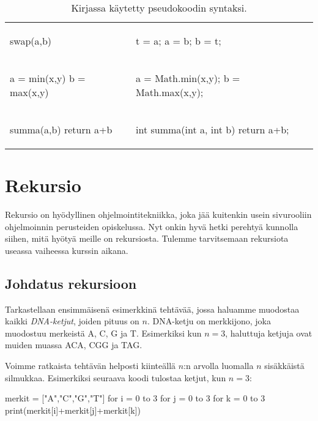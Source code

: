 \begin{table}
\begin{tabular}{ll}
\begin{smallcode}[xleftmargin=0pt]
swap(a,b)
\end{smallcode}
&
\begin{smallcode}
t = a;
a = b;
b = t;
\end{smallcode}
\\
\begin{smallcode}[xleftmargin=0pt]
a = min(x,y)
b = max(x,y)
\end{smallcode}
&
\begin{smallcode}
a = Math.min(x,y);
b = Math.max(x,y);
\end{smallcode}
\\
\begin{smallcode}[xleftmargin=0pt]
summa(a,b)
    return a+b
\end{smallcode}
&
\begin{smallcode}
int summa(int a, int b) {
    return a+b;
}
\end{smallcode}
\\
\end{tabular}
\caption{Kirjassa käytetty pseudokoodin syntaksi.}
\label{tab:psekoo}
\end{table}

\section{Rekursio}

Rekursio on hyödyllinen ohjelmointitekniikka,
joka jää kuitenkin usein sivurooliin ohjelmoinnin perusteiden opiskelussa.
Nyt onkin hyvä hetki perehtyä kunnolla siihen,
mitä hyötyä meille on rekursiosta.
Tulemme tarvitsemaan rekursiota useassa vaiheessa kurssin aikana.

\subsection{Johdatus rekursioon}

Tarkastellaan ensimmäisenä esimerkkinä tehtävää,
jossa haluamme muodostaa kaikki \emph{DNA-ketjut},
joiden pituus on $n$.
DNA-ketju on merkkijono, joka muodostuu merkeistä A, C, G ja T.
Esimerkiksi kun $n=3$, haluttuja ketjuja ovat muiden muassa
ACA, CGG ja TAG.

Voimme ratkaista tehtävän helposti kiinteällä $n$:n arvolla
luomalla $n$ sisäk\-käistä silmukkaa.
Esimerkiksi seuraava koodi tulostaa ketjut, kun $n=3$:

\begin{code}
merkit = ["A","C","G","T"]
for i = 0 to 3
    for j = 0 to 3
        for k = 0 to 3
            print(merkit[i]+merkit[j]+merkit[k])
\end{code}

